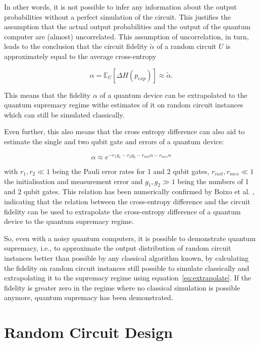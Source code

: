 In other words, it is not possible to infer any information about the output
probabilities without a perfect simulation of the circuit.
This justifies the assumption that the actual output probabilities and the output
of the quantum computer are (almost) uncorrelated.
This assumption of uncorrelation, in turn, leads to the conclusion that the
circuit fidelity $\tilde{\alpha}$ of a random
circuit $U$ is approximately equal to the average cross-entropy

\begin{equation}
  \label{eq:extrapolate}
  \alpha = \mathbb{E}_U[\Delta H(p_{exp})] \approx \tilde{\alpha}.
\end{equation}

This means that the fidelity $\alpha$ of a quantum device can be extrapolated to
the quantum supremacy regime withe estimates of it on random circuit instances
which can still be simulated classically.

Even further, this also means that the cross entropy difference can also aid to estimate
the single and two qubit gate and errors of a quantum device:

\begin{equation}
  \alpha \approx e^{-r_1g_1 - r_2g_2 -r_{init}n -r_{mes}n}
\end{equation}

with $r_1, r_2 \ll 1$ being the Pauli error rates for 1 and 2 qubit gates, $r_{init},
r_{mes} \ll 1$ the initialisation and measurement error and $g_1,g_2 \gg 1$ being the
numbers of 1 and 2 qubit gates. This relation has been numerically confirmed by
Boixo et al. \cite{Boixo2018supremacy}, indicating that the relation between the
cross-entropy difference and the circuit fidelity can be used to extrapolate the
cross-entropy difference of a quantum device to the quantum supremacy regime.

So, even with a noisy quantum computers, it is possible to demonstrate quantum
supremacy, i.e., to approximate the output distribution of random circuit instances
better than possible by any classical algorithm known, by
calculating the fidelity on random circuit instances still possible to simulate
classically and extrapolating it to the supremacy regime using
equation~\ref{eq:extrapolate}.
If the fidelity is greater zero in the regime where no classical simulation is possible anymore,
quantum supremacy has been demonstrated.

\section{Random Circuit Design}

